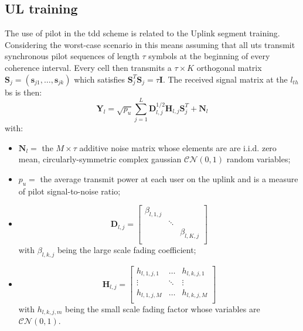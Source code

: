 \documentclass[11pt]{book}
\begin{document}
\subsection{UL training}
The use of pilot in the \gls{tdd} scheme is related to the Uplink segment training. Considering the worst-case scenario in this means assuming that all \gls{ut}s transmit synchronous pilot sequences of length $\tau$ symbols at the beginning of every coherence interval. Every cell then transmits a $\tau \times K$ orthogonal matrix $\textbf{S}_j = (\textbf{s}_{j1},\dots,\textbf{s}_{jk})$ which satisfies $\textbf{S}_j^T\textbf{S}_j = \tau \textbf{I}$. The received signal matrix at the $l_{th}$ \gls{bs} is then:
\begin{equation}
\textbf{Y}_l = \sqrt{p_u}\sum_{j=1}^{L}\textbf{D}_{l,j}^{1/2}\textbf{H}_{l,j}\textbf{S}_j^T + \textbf{N}_l
\label{eq:recSignal}
\end{equation}
with:
\begin{itemize}
  \item $\textbf{N}_l = $ the $M \times \tau$ additive noise matrix whose elements are are i.i.d. zero mean, circularly-symmetric complex gaussian $\mathcal{CN}(0,1)$ random variables;\\
  \item $p_u = $ the average transmit power at each user on the uplink and is a measure of pilot signal-to-noise ratio;\\
  \item
  \begin{equation}
    \textbf{D}_{l,j} =
    \begin{bmatrix}
      \beta_{l,1,j} &        &              \\
                    & \ddots &              \\
                    &        & \beta_{l,K,j}\\
    \end{bmatrix}
  \end{equation}
  with $\beta_{l,k,j}$ being the large scale fading coefficient;\\
  \item
  \begin{equation}
    \textbf{H}_{l,j} =
    \begin{bmatrix}
      h_{l,1,j,1} & \dots  & h_{l,k,j,1}\\
      \vdots      & \ddots & \vdots\\
      h_{l,1,j,M} & \dots & h_{l,k,j,M}\\
    \end{bmatrix}
  \end{equation}
  with $h_{l,k,j,m}$ being the small scale fading factor whose variables are $\mathcal{CN}(0,1)$.\\
\end{itemize}
\end{document}
